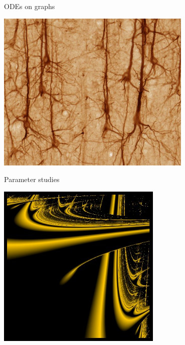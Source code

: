 \documentclass{beamer}
\newcommand{\rem}[1]{}
\newcommand{\heading}[1]{\centerline{\Large #1} \vspace{0.5em}}
\begin{document}
\begin{frame}
\vspace{2ex}

\begin{minipage}{0.48\textwidth}\begin{center}
  ODEs on graphs

  \includegraphics[draft=false,width=0.7\textwidth]{neuron.jpg}
 \end{center}\end{minipage}
\begin{minipage}{0.48\textwidth}\begin{center}
  Parameter studies
 
  \vspace{0.5ex}
  \includegraphics[draft=false,width=0.59\textwidth]{lyap.jpg}
 \end{center} \end{minipage}

\end{frame}

\rem{
\begin{frame}
 \heading{Introduction}

 \begin{itemize}
  \item Solve large systems of coupled ODEs
  \item Use odeint - Boost Library
  \item Compare several open source frameworks for GPGPU computation
  \item VexCL, ViennaCL, Thrust, MTL
 \end{itemize}

\end{frame}
}
\end{document}
